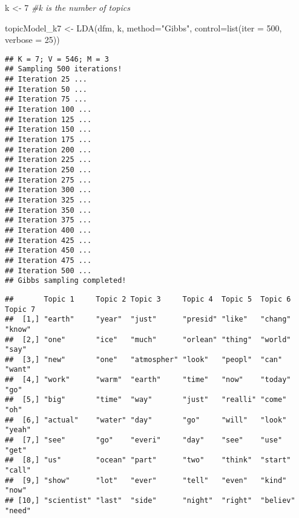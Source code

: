 \documentclass[
]{article}
\newenvironment{Shaded}{\begin{snugshade}}{\end{snugshade}}
\newcommand{\AttributeTok}[1]{\textcolor[rgb]{0.77,0.63,0.00}{#1}}
\newcommand{\CommentTok}[1]{\textcolor[rgb]{0.56,0.35,0.01}{\textit{#1}}}
\newcommand{\DecValTok}[1]{\textcolor[rgb]{0.00,0.00,0.81}{#1}}
\newcommand{\FunctionTok}[1]{\textcolor[rgb]{0.00,0.00,0.00}{#1}}
\newcommand{\NormalTok}[1]{#1}
\newcommand{\OtherTok}[1]{\textcolor[rgb]{0.56,0.35,0.01}{#1}}
\newcommand{\SpecialCharTok}[1]{\textcolor[rgb]{0.00,0.00,0.00}{#1}}
\newcommand{\StringTok}[1]{\textcolor[rgb]{0.31,0.60,0.02}{#1}}
\begin{document}
\begin{Shaded}
\begin{Highlighting}[]
\NormalTok{k }\OtherTok{\textless{}{-}} \DecValTok{7} \CommentTok{\#k is the number of topics}

\NormalTok{topicModel\_k7 }\OtherTok{\textless{}{-}} \FunctionTok{LDA}\NormalTok{(dfm, }
\NormalTok{                     k, }
                     \AttributeTok{method=}\StringTok{"Gibbs"}\NormalTok{, }
                     \AttributeTok{control=}\FunctionTok{list}\NormalTok{(}\AttributeTok{iter =} \DecValTok{500}\NormalTok{, }\AttributeTok{verbose =} \DecValTok{25}\NormalTok{))}
\end{Highlighting}
\end{Shaded}

\begin{verbatim}
## K = 7; V = 546; M = 3
## Sampling 500 iterations!
## Iteration 25 ...
## Iteration 50 ...
## Iteration 75 ...
## Iteration 100 ...
## Iteration 125 ...
## Iteration 150 ...
## Iteration 175 ...
## Iteration 200 ...
## Iteration 225 ...
## Iteration 250 ...
## Iteration 275 ...
## Iteration 300 ...
## Iteration 325 ...
## Iteration 350 ...
## Iteration 375 ...
## Iteration 400 ...
## Iteration 425 ...
## Iteration 450 ...
## Iteration 475 ...
## Iteration 500 ...
## Gibbs sampling completed!
\end{verbatim}

\begin{Shaded}
\end{Shaded}

\begin{verbatim}
##       Topic 1     Topic 2 Topic 3     Topic 4  Topic 5  Topic 6  Topic 7
##  [1,] "earth"     "year"  "just"      "presid" "like"   "chang"  "know" 
##  [2,] "one"       "ice"   "much"      "orlean" "thing"  "world"  "say"  
##  [3,] "new"       "one"   "atmospher" "look"   "peopl"  "can"    "want" 
##  [4,] "work"      "warm"  "earth"     "time"   "now"    "today"  "go"   
##  [5,] "big"       "time"  "way"       "just"   "realli" "come"   "oh"   
##  [6,] "actual"    "water" "day"       "go"     "will"   "look"   "yeah" 
##  [7,] "see"       "go"    "everi"     "day"    "see"    "use"    "get"  
##  [8,] "us"        "ocean" "part"      "two"    "think"  "start"  "call" 
##  [9,] "show"      "lot"   "ever"      "tell"   "even"   "kind"   "now"  
## [10,] "scientist" "last"  "side"      "night"  "right"  "believ" "need"
\end{verbatim}
\end{document}
